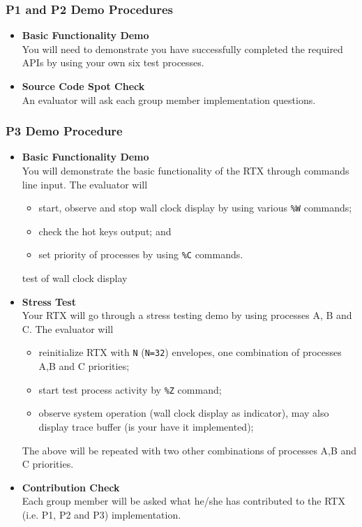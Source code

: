 \subsubsection*{P1 and P2 Demo Procedures} 
\begin{itemize}
\item {\bf Basic Functionality Demo}\\
You will need to demonstrate you have successfully completed the required APIs by using your own six test processes.
\item {\bf Source Code Spot Check} \\
An evaluator will ask each group member implementation questions.
\end{itemize}

\subsubsection*{P3 Demo Procedure}
\label{subsec_p3demo}
\begin{itemize}
\item {\bf Basic Functionality Demo}\\
You will demonstrate the basic functionality of the RTX through commands line input. The evaluator will
\begin{itemize}
\item start, observe and stop wall clock display by using various \verb+%W+ commands;
\item check the hot keys output; and
\item set priority of processes by using \verb+%C+ commands.
\end{itemize}test of wall clock display 

\item{\bf Stress Test} \\
Your RTX will go through a stress testing demo by using processes A, B and C. The evaluator will
\begin{itemize}
\item reinitialize RTX with \verb+N+ (\verb+N=32+) envelopes, one combination of processes A,B and C priorities;
\item start test process activity by \verb+%Z+ command;
\item observe system operation (wall clock display as indicator), may also display trace buffer (is your have it implemented);
\end{itemize}
The above will be repeated with two other combinations of processes A,B and C priorities.
\item {\bf Contribution Check} \\
Each group member will be asked what he/she has contributed to the RTX (i.e. P1, P2 and P3) implementation.
\end{itemize}


